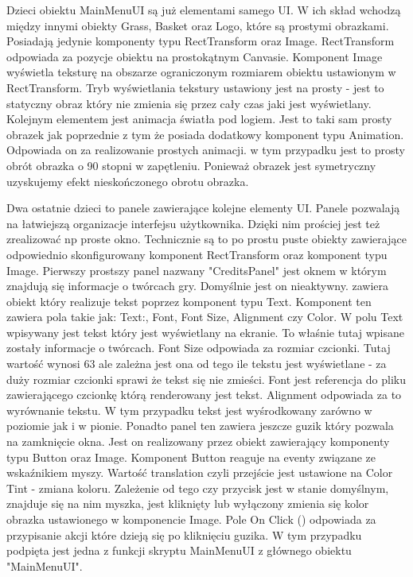\documentclass[a4paper,12pt,twoside,openany]{report}
\begin{document}
Dzieci obiektu MainMenuUI są już elementami samego UI. W ich skład wchodzą między innymi obiekty Grass, Basket oraz Logo, które są prostymi obrazkami. Posiadają jedynie komponenty typu RectTransform oraz Image. RectTransform odpowiada za pozycje obiektu na prostokątnym Canvasie. Komponent Image wyświetla teksturę na obszarze ograniczonym rozmiarem obiektu ustawionym w RectTransform. Tryb wyświetlania tekstury ustawiony jest na prosty - jest to statyczny obraz który nie zmienia się przez cały czas jaki jest wyświetlany. Kolejnym elementem jest animacja światła pod logiem. Jest to taki sam prosty obrazek jak poprzednie z tym że posiada dodatkowy komponent typu Animation. Odpowiada on za realizowanie prostych animacji. w tym przypadku jest to prosty obrót obrazka o 90 stopni w zapętleniu. Ponieważ obrazek jest symetryczny uzyskujemy efekt nieskończonego obrotu obrazka.

Dwa ostatnie dzieci to panele zawierające kolejne elementy UI. Panele pozwalają na łatwiejszą organizacje interfejsu użytkownika. Dzięki nim prościej jest też zrealizować np proste okno. Technicznie są to po prostu puste obiekty zawierające odpowiednio skonfigurowany komponent RectTransform oraz komponent typu Image. Pierwszy prostszy panel nazwany "CreditsPanel" jest oknem w którym znajdują się informacje o twórcach gry. Domyślnie jest on nieaktywny. zawiera obiekt który realizuje tekst poprzez komponent typu Text. Komponent ten zawiera pola takie jak: Text:, Font, Font Size, Alignment czy Color. W polu Text wpisywany jest tekst który jest wyświetlany na ekranie. To właśnie tutaj wpisane zostały informacje o twórcach. Font Size odpowiada za rozmiar czcionki. Tutaj wartość wynosi 63 ale zależna jest ona od tego ile tekstu jest wyświetlane - za duży rozmiar czcionki sprawi że tekst się nie zmieści. Font jest referencja do pliku zawierającego czcionkę którą renderowany jest tekst. Alignment odpowiada za to wyrównanie tekstu. W tym przypadku tekst jest wyśrodkowany zarówno w poziomie jak i w pionie. Ponadto panel ten zawiera jeszcze guzik który pozwala na zamknięcie okna. Jest on realizowany przez obiekt zawierający komponenty typu Button oraz Image. Komponent Button reaguje na eventy związane ze wskaźnikiem myszy. Wartość translation czyli przejście jest ustawione na Color Tint - zmiana koloru. Zależenie od tego czy przycisk jest w stanie domyślnym, znajduje się na nim myszka, jest kliknięty lub wyłączony zmienia się kolor obrazka ustawionego w komponencie Image. Pole On Click () odpowiada za przypisanie akcji które dzieją się po kliknięciu guzika. W tym przypadku podpięta jest jedna z funkcji skryptu MainMenuUI z głównego obiektu "MainMenuUI".
\end{document}
